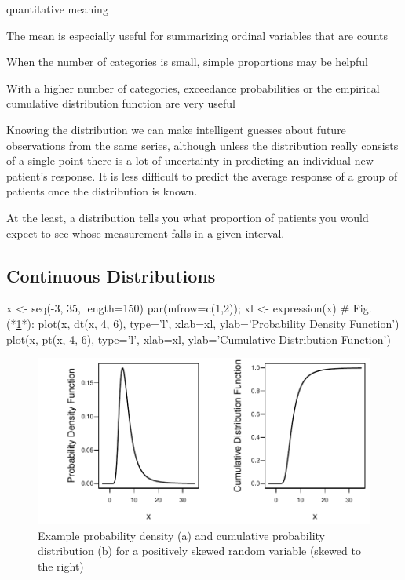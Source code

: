     quantitative meaning
  \item The mean is especially useful for summarizing ordinal
    variables that are counts
  \item When the number of categories is small, simple proportions may
    be helpful
  \item With a higher number of categories, exceedance probabilities
    or the empirical cumulative distribution function are very useful
  \ei
\item Knowing the distribution we can make intelligent guesses about
  future observations from the same series, although unless the
  distribution really 
  consists of a single point there is a lot of uncertainty in
  predicting an individual new patient's response.  It is less
  difficult to predict the average response of a group of patients
  once the distribution is known.  
\item At the least, a distribution tells
  you what proportion of patients you would expect to see whose
  measurement falls in a given interval.
\ei

\subsection{Continuous Distributions}
\begin{Schunk}
\begin{Sinput}
x <- seq(-3, 35, length=150)
par(mfrow=c(1,2)); xl <- expression(x)   # Fig. (*\ref{fig:descript-pdfcdf}*):
plot(x, dt(x, 4, 6), type='l', xlab=xl, ylab='Probability Density Function')
plot(x, pt(x, 4, 6), type='l', xlab=xl, ylab='Cumulative Distribution Function')
\end{Sinput}
\begin{figure}[htbp]

\centerline{\includegraphics{descript-pdfcdf-1} }

\caption[Density and cumulative distribution functions]{Example probability density (a) and cumulative probability distribution (b) for a positively skewed random variable (skewed to the right)}\label{fig:descript-pdfcdf}
\end{figure}
\end{Schunk}

